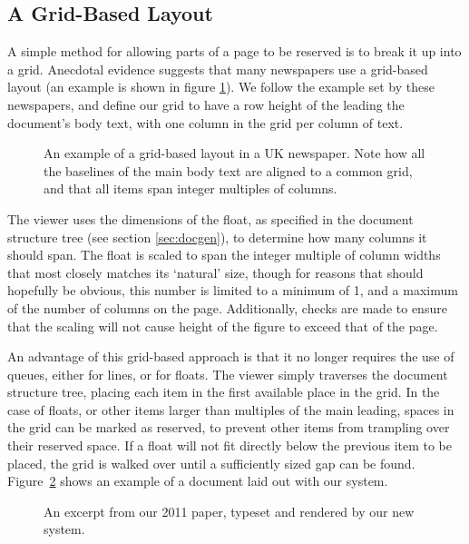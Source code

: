\subsection{A Grid-Based Layout}
A simple method for allowing parts of a page to be reserved is to break it up into a grid. Anecdotal evidence suggests that many newspapers use a grid-based layout (an example is shown in figure \ref{fig:gridlayout}). We follow the example set by these newspapers, and define our grid to have a row height of the leading the document's body text, with one column in the grid per column of text.

\begin{figure}
    \caption{An example of a grid-based layout in a UK newspaper. Note how all the baselines of the main body text are aligned to a common grid, and that all items span integer multiples of columns.}
    \label{fig:gridlayout}
\end{figure}

The viewer uses the dimensions of the float, as specified in the document structure tree (see section \ref{sec:docgen}), to determine how many columns it should span. The float is scaled to span the integer multiple of column widths that most closely matches its `natural' size, though for reasons that should hopefully be obvious, this number is limited to a minimum of 1, and a maximum of the number of columns on the page. Additionally, checks are made to ensure that the scaling will not cause height of the figure to exceed that of the page.

An advantage of this grid-based approach is that it no longer requires the use of queues, either for lines, or for floats. The viewer simply traverses the document structure tree, placing each item in the first available place in the grid. In the case of floats, or other items larger than multiples of the main leading, spaces in the grid can be marked as reserved, to prevent other items from trampling over their reserved space. If a float will not fit directly below the previous item to be placed, the grid is walked over until a sufficiently sized gap can be found. Figure~\ref{fig:screengrab} shows an example of a document laid out with our system.

\begin{figure}
    \caption{An excerpt from our 2011 paper, typeset and rendered by our new system.}
    \label{fig:screengrab}
\end{figure}

